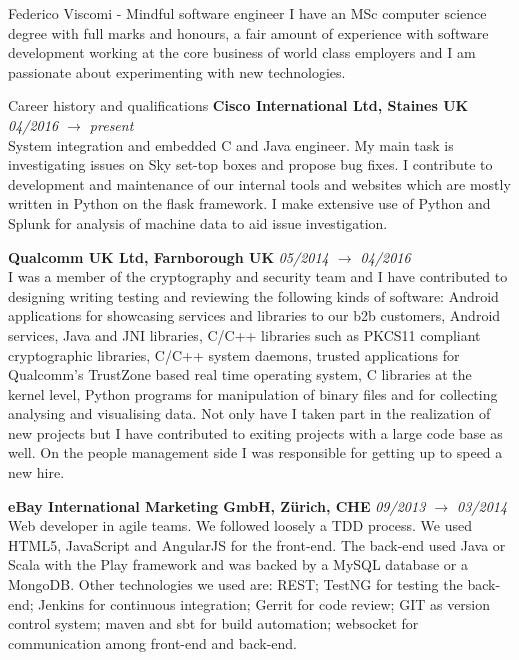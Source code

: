 \documentclass{resume}
\begin{document}
	\begin{rSection}{Federico Viscomi - Mindful software engineer}
		I have an MSc computer science degree with full marks and honours, 
		a fair amount of experience with software development working at the core business of world class employers 
		and I am passionate about experimenting with new technologies.
	\end{rSection}
	\begin{rSection}{Career history and qualifications}
		{\bf Cisco International Ltd, Staines UK} \hfill {\em 04/2016 $\rightarrow$  present}\\
			System integration and embedded C and Java engineer. 
			My main task is investigating issues on Sky set-top boxes and propose bug fixes.
			I contribute to development and maintenance of our internal tools and websites which are mostly written in Python on the flask framework.
			I make extensive use of Python and Splunk for analysis of machine data to aid issue investigation.

		{\bf Qualcomm UK Ltd, Farnborough UK} \hfill {\em 05/2014 $\rightarrow$ 04/2016}\\
			I was a member of the cryptography and security team and I have contributed to designing writing testing and reviewing the following kinds of software:
			Android applications for showcasing services and libraries to our b2b customers,
			Android services, 
			Java and JNI libraries, 
			C/C++ libraries such as PKCS11 compliant cryptographic libraries,
			C/C++ system daemons,
			trusted applications for Qualcomm's TrustZone based real time operating system,
			C libraries at the kernel level,
			Python programs for manipulation of binary files and for collecting analysing and visualising data.	
			Not only have I taken part in the realization of new projects but I have contributed to exiting projects with a large code base as well.
			On the people management side I was responsible for getting up to speed a new hire.

		{\bf eBay International Marketing GmbH, Z\"urich, CHE} \hfill {\em 09/2013 $\rightarrow$ 03/2014}\\
			Web developer in agile teams.
			We followed loosely a TDD process.
			We used HTML5, JavaScript and AngularJS for the front-end. 
			The back-end used Java or Scala with the Play framework and was backed by a MySQL database or a MongoDB. 
			Other technologies we used are: 
			REST; TestNG for testing the back-end; 
			Jenkins for continuous integration; 
			Gerrit for code review; 
			GIT as version control system; 
			maven and sbt for build automation;
			websocket for communication among front-end and back-end.	  
	    

\end{rSection}
\end{document}

